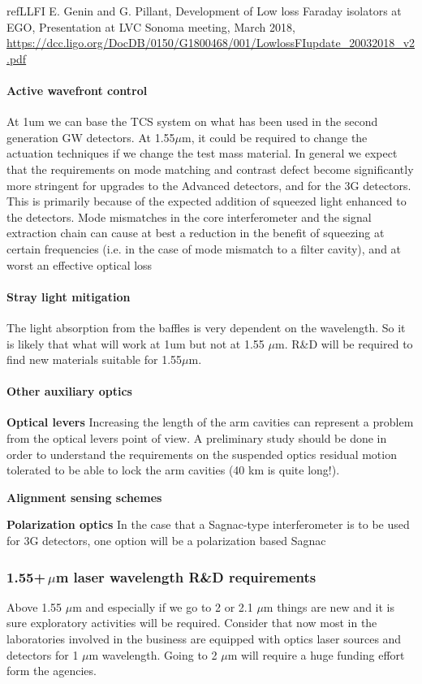 refLLFI E. Genin and G. Pillant, Development of Low loss Faraday isolators at EGO, Presentation at LVC Sonoma meeting, March 2018, \url{https://dcc.ligo.org/DocDB/0150/G1800468/001/LowlossFIupdate_20032018_v2.pdf}

\paragraph{Active wavefront control}
At 1um we can base the TCS system on what has been used in the second generation GW detectors.
At 1.55$\mu$m, it could be required to change the actuation techniques if we change the test mass material. 
In general we expect that the requirements on mode matching and contrast defect become significantly more stringent for upgrades to the Advanced detectors, and for the 3G detectors. This is primarily because of the expected addition of squeezed light enhanced to the detectors. Mode mismatches in the core interferometer and the signal extraction chain can cause at best a reduction in the benefit of squeezing at certain frequencies (i.e. in the case of mode mismatch to a filter cavity), and at worst an effective optical loss 

\paragraph{Stray light mitigation}
The light absorption from the baffles is very dependent on the wavelength. So it is likely that what will work at 1um but not at 1.55 $\mu$m. R\&D will be required to find new materials suitable for 1.55$\mu$m.  

\paragraph{Other auxiliary optics}
{\bf Optical levers}
Increasing the length of the arm cavities can represent a problem from the optical levers point of view. A preliminary study should be done in order to understand the requirements on the suspended optics residual motion tolerated to be able to lock the arm cavities (40 km is quite long!).

{\bf Alignment sensing schemes}

{\bf Polarization optics}
In the case that a Sagnac-type interferometer is to be used for 3G detectors, one option will be a polarization based Sagnac

\subsubsection{1.55+\,$\mu$m laser wavelength R\&D requirements}
Above 1.55 $\mu$m and especially if we go to 2 or 2.1 $\mu$m things are new and it is sure exploratory activities will be required. Consider that now most in the laboratories involved in the business are equipped with optics laser sources and detectors for 1 $\mu$m wavelength. Going to 2 $\mu$m will require a huge funding effort form the agencies.\\

